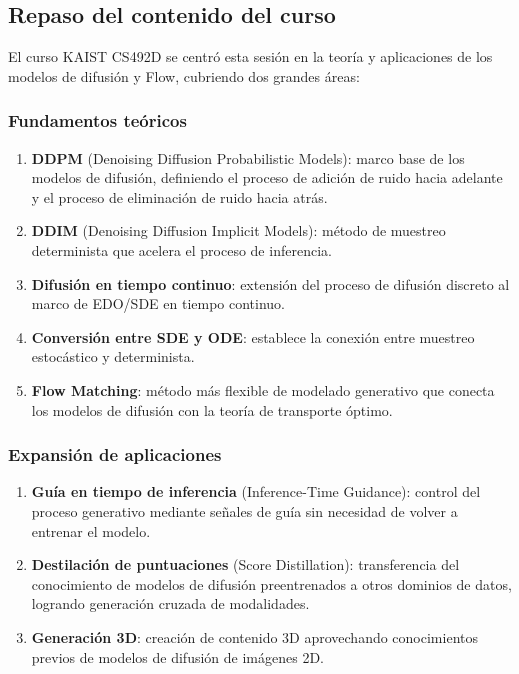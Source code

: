 \documentclass[a4paper]{article}
\begin{document}
\subsection{Repaso del contenido del curso}

El curso KAIST CS492D se centró esta sesión en la teoría y aplicaciones de los modelos de difusión y Flow, cubriendo dos grandes áreas:

\subsubsection{Fundamentos teóricos}

\begin{enumerate}
    \item \textbf{DDPM} (Denoising Diffusion Probabilistic Models): marco base de los modelos de difusión, definiendo el proceso de adición de ruido hacia adelante y el proceso de eliminación de ruido hacia atrás.
    \item \textbf{DDIM} (Denoising Diffusion Implicit Models): método de muestreo determinista que acelera el proceso de inferencia.
    \item \textbf{Difusión en tiempo continuo}: extensión del proceso de difusión discreto al marco de EDO/SDE en tiempo continuo.
    \item \textbf{Conversión entre SDE y ODE}: establece la conexión entre muestreo estocástico y determinista.
    \item \textbf{Flow Matching}: método más flexible de modelado generativo que conecta los modelos de difusión con la teoría de transporte óptimo.
\end{enumerate}

\subsubsection{Expansión de aplicaciones}

\begin{enumerate}
    \item \textbf{Guía en tiempo de inferencia} (Inference-Time Guidance): control del proceso generativo mediante señales de guía sin necesidad de volver a entrenar el modelo.
    \item \textbf{Destilación de puntuaciones} (Score Distillation): transferencia del conocimiento de modelos de difusión preentrenados a otros dominios de datos, logrando generación cruzada de modalidades.
    \item \textbf{Generación 3D}: creación de contenido 3D aprovechando conocimientos previos de modelos de difusión de imágenes 2D.
\end{enumerate}
\end{document}
